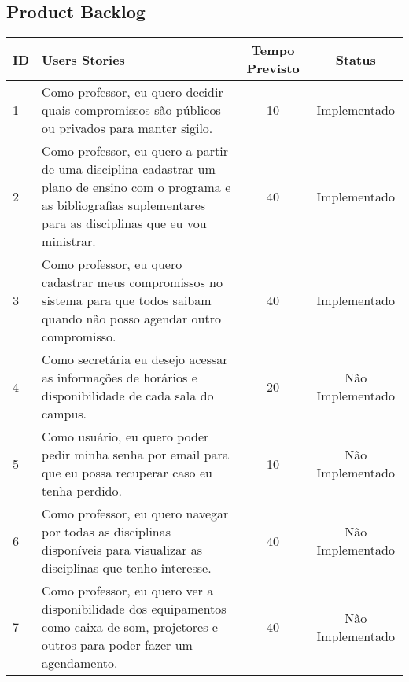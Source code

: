 \setlength{\arrayrulewidth}{1.5pt}
\begin{landscape}
	\chapter{Product Backlog}
		\begin{longtable}{|p{0.5in}|p{6in}|c|c|}
		
		\hline
		  {\bf ID} & {\bf Users Stories} & {\bf Tempo Previsto} & {\bf Status} \\
	
		\hline \rowcolor{cImplementado}
		         1 & Como professor, eu quero decidir quais compromissos são públicos ou privados para manter sigilo. &         10 & Implementado \\
		
		\hline \rowcolor{cImplementado}
		         2 & Como professor, eu quero a partir de uma disciplina cadastrar um plano de ensino com o programa e as bibliografias suplementares para as disciplinas que eu vou ministrar. &         40 & Implementado \\
		
		\hline \rowcolor{cImplementado}
		         3 & Como professor, eu quero cadastrar meus compromissos no sistema para que todos saibam quando não posso agendar outro compromisso. &         40 & Implementado \\
		\hline \rowcolor{cNaoImplementado}
		         4 & Como secretária eu desejo acessar as informações de horários e disponibilidade de cada sala do campus.  &         20 & Não Implementado \\
		
		\hline  \rowcolor{cNaoImplementado}
		         5 & Como usuário, eu quero poder pedir minha senha por email para que eu possa recuperar caso eu tenha perdido. &         10 & Não Implementado \\
		
		\hline \rowcolor{cNaoImplementado}
		         6 & Como professor, eu quero navegar por todas as disciplinas disponíveis para visualizar as disciplinas que tenho interesse.  &         40 & Não Implementado \\
		
		\hline \rowcolor{cNaoImplementado}
		         7 & Como professor, eu quero ver a disponibilidade dos equipamentos como caixa de som, projetores e outros para poder fazer um agendamento. &         40 & Não Implementado \\
		

\end{longtable}
\end{landscape}
